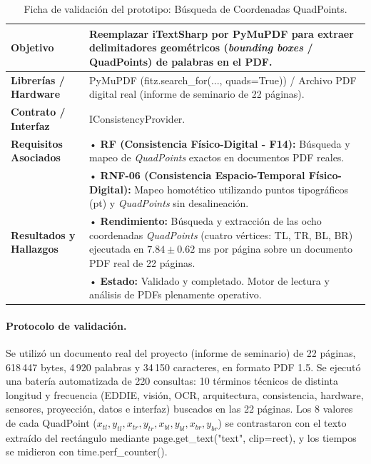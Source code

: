 \begin{table}[H]
    \centering
    \caption{Ficha de validación del prototipo: Búsqueda de Coordenadas QuadPoints.}
    \label{tab:ficha_f14}
    \begin{tabular}{|L{3.2cm}|L{11.0cm}|}
        \hline
        \textbf{Objetivo} & Reemplazar iTextSharp por PyMuPDF para extraer delimitadores geométricos (\textit{bounding boxes} / QuadPoints) de palabras en el PDF. \\ \hline
        \textbf{Librerías / Hardware} & PyMuPDF (fitz.search\_for(..., quads=True)) / Archivo PDF digital real (informe de seminario de 22 páginas). \\ \hline
        \textbf{Contrato / Interfaz} & IConsistencyProvider. \\ \hline
        \textbf{Requisitos Asociados} &
        • \textbf{RF (Consistencia Físico-Digital - F14):} Búsqueda y mapeo de \textit{QuadPoints} exactos en documentos PDF reales. \vspace{0.1cm} \\
        & • \textbf{RNF-06 (Consistencia Espacio-Temporal Físico-Digital):} Mapeo homotético utilizando puntos tipográficos (pt) y \textit{QuadPoints} sin desalineación. \\ \hline
        \textbf{Resultados y Hallazgos} &
        • \textbf{Rendimiento:} Búsqueda y extracción de las ocho coordenadas \textit{QuadPoints} (cuatro vértices: TL, TR, BL, BR) ejecutada en $7.84 \pm 0.62$ ms por página sobre un documento PDF real de 22 páginas. \vspace{0.1cm} \\
        & • \textbf{Estado:} Validado y completado. Motor de lectura y análisis de PDFs plenamente operativo. \\ \hline
    \end{tabular}
\end{table}
 
\paragraph{Protocolo de validación.} Se utilizó un documento real del proyecto (informe de seminario) de 22 páginas, 618\,447 bytes, 4\,920 palabras y 34\,150 caracteres, en formato PDF 1.5. Se ejecutó una batería automatizada de 220 consultas: 10 términos técnicos de distinta longitud y frecuencia (EDDIE, visión, OCR, arquitectura, consistencia, hardware, sensores, proyección, datos e interfaz) buscados en las 22 páginas. Los 8 valores de cada QuadPoint ($x_{tl}, y_{tl}, x_{tr}, y_{tr}, x_{bl}, y_{bl}, x_{br}, y_{br}$) se contrastaron con el texto extraído del rectángulo mediante page.get\_text("text", clip=rect), y los tiempos se midieron con time.perf\_counter().
 

